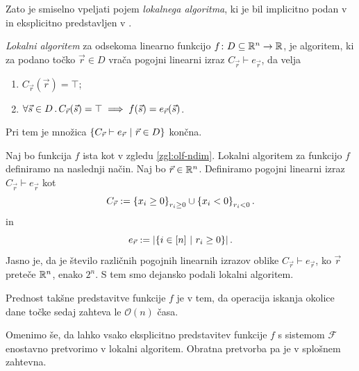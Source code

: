 Zato je smiselno vpeljati pojem \emph{lokalnega algoritma}, ki je bil implicitno podan v \cite{zbMATH06805750} in eksplicitno predstavljen v \cite{Petkovic2017}.

\begin{definicija}
    \emph{Lokalni algoritem} za odsekoma linearno funkcijo \(f \colon D \subseteq \mathbb{R}^{n} \to \mathbb{R}\), je algoritem, ki za podano točko \(\vec{r} \in D\) vrača pogojni linearni izraz \(C_{\vec{r}} \vdash e_{\vec{r}}\), da velja
    \begin{enumerate}
        \item \(C_{\vec{r}}(\vec{r}) = \top\);
        \item \(\forall \vec{s} \in D \,.\, C_{\vec{r}}(\vec{s}) = \top \implies f(\vec{s}) = e_{\vec{r}}(\vec{s})\).
    \end{enumerate}
    Pri tem je množica \(\left\{C_{\vec{r}} \vdash e_{\vec{r}} \ | \ \vec{r} \in D\right\}\) končna.
\end{definicija}

\begin{zgled}
  Naj bo funkcija \(f\) ista kot v zgledu \ref{zgl:olf-ndim}. Lokalni algoritem za funkcijo \(f\) definiramo na naslednji način. Naj bo \(\vec{r} \in \mathbb{R}^n\). Definiramo pogojni linearni izraz \(C_{\vec{r}} \vdash e_{\vec{r}}\) kot
  \[
    C_{\vec{r}} := \left\{x_i \geq 0\right\}_{r_i \geq 0} \cup \left\{x_i < 0\right\}_{r_i < 0}.
  \]
  in
  \[
    e_{\vec{r}} := \left|\left\{i \in [n] \ | \ r_i \geq 0\right\}\right|.
  \]
  Jasno je, da je število različnih pogojnih linearnih izrazov oblike \(C_{\vec{r}} \vdash e_{\vec{r}}\), ko \(\vec{r}\) preteče \(\mathbb{R}^n\), enako \(2^n\). S tem smo dejansko podali lokalni algoritem.

  Prednost takšne predstavitve funkcije \(f\) je v tem, da operacija iskanja okolice dane točke sedaj zahteva le \(\mathcal{O}(n)\) časa.
\end{zgled}

Omenimo še, da lahko vsako eksplicitno predstavitev funkcije \(f\) s sistemom \(\mathcal{F}\) enostavno pretvorimo v lokalni algoritem. Obratna pretvorba pa je v splošnem zahtevna.

